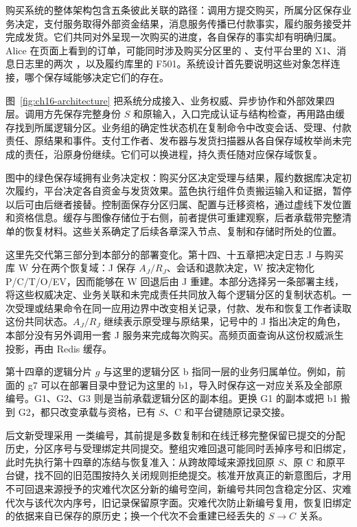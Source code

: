 购买系统的整体架构包含五条彼此关联的路径：调用方提交购买，所属分区保存业务决定，支付服务取得外部资金结果，消息服务传播已付款事实，履约服务接受并完成发货。它们共同对外呈现一次购买的进度，各自保存的事实却有明确归属。Alice 在页面上看到的订单，可能同时涉及购买分区里的 、支付平台里的 X1、消息日志里的两次 ，以及履约库里的 F501。系统设计首先要说明这些对象怎样连接，哪个保存域能够决定它们的存在。

图~\ref{fig:ch16-architecture} 把系统分成接入、业务权威、异步协作和外部效果四层。调用方先保存完整身份 $S$ 和原输入，入口完成认证与结构检查，再用路由缓存找到所属逻辑分区。业务组的确定性状态机在复制命令中改变会话、受理、付款责任、原结果和事件。支付工作者、发布器与发货扫描器从各自保存域枚举尚未完成的责任，沿原身份继续。它们可以换进程，持久责任随对应保存域恢复。


图中的绿色保存域拥有业务决定权：购买分区决定受理与结果，履约数据库决定初次履约，平台决定各自资金与发货效果。蓝色执行组件负责搬运输入和证据，暂停以后可由后继者接替。控制面保存分区归属、配置与迁移资格，通过虚线下发位置和资格信息。缓存与图像存储位于右侧，前者提供可重建观察，后者承载带完整清单的恢复材料。这些关系确定了后续各章深入节点、复制和存储时所处的位置。

这里先交代第三部分到本部分的部署变化。第十四、十五章把决定日志 J 与购买库 W 分在两个恢复域：J 保存 $A_J/R_J$、会话和退款决定，W 按决定物化 P/C/T/O/EV，因而能够在 W 回退后由 J 重建。本部分选择另一条部署主线，将这些权威决定、业务关联和未完成责任共同放入每个逻辑分区的复制状态机。一次受理或结果命令在同一应用边界中改变相关记录，付款、发布和恢复工作者读取这份共同状态。$A_J/R_J$ 继续表示原受理与原结果，记号中的 J 指出决定的角色，本部分没有另外调用一套 J 服务来完成每次购买。高频页面查询从这份权威派生投影，再由 Redis 缓存。

第十四章的逻辑分片 $g$ 与这里的逻辑分区 b 指同一层的业务归属单位。例如，前面的 g7 可以在部署目录中登记为这里的 b1，导入时保存这一对应关系及全部原编号。G1、G2、G3 则是当前承载逻辑分区的副本组。更换 G1 的副本或把 b1 搬到 G2，都只改变承载与资格，已有 $S$、C 和平台键随原记录交接。

后文新受理采用  一类编号，其前提是多数复制和在线迁移完整保留已提交的分配历史，分区序号与受理绑定共同提交。整组灾难回退可能同时丢掉序号和旧绑定，此时先执行第十四章的冻结与恢复准入：从跨故障域来源找回原 $S$、原 C 和原平台键，找不回的旧范围按持久关闭规则拒绝提交。核准开放真正的新意图后，才用不可回退来源授予的灾难代次区分新的编号空间，新编号共同包含稳定分区、灾难代次与该代次内序号，旧记录保留原字面。灾难代次防止新编号复用，恢复旧绑定的依据来自已保存的原历史；换一个代次不会重建已经丢失的 $S\to C$ 关系。

